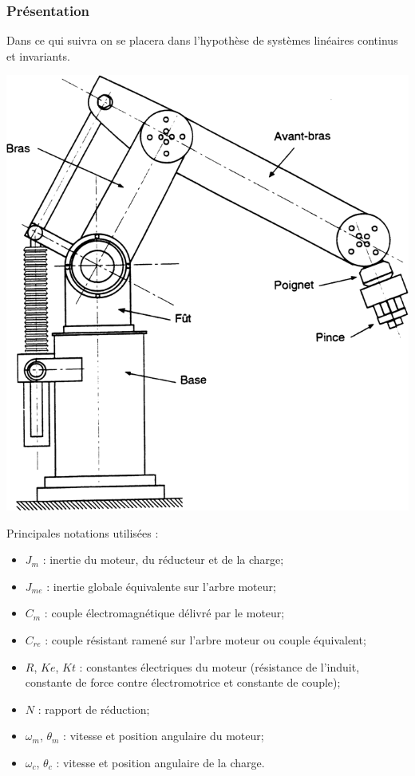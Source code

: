 \subsubsection{Présentation}

Dans ce qui suivra on se placera dans l’hypothèse de systèmes linéaires continus et invariants.


\begin{minipage}[c]{.3\linewidth}
\begin{center}
\includegraphics[width=\textwidth]{png/fig_01-1O}
\end{center}
\end{minipage} \hfill
\begin{minipage}[c]{.65\linewidth}
Principales notations utilisées : 
\begin{itemize}
\item $J_m$ : inertie du moteur, du réducteur et de la charge;
\item $J_{me}$ : inertie globale équivalente sur l’arbre moteur;
\item $C_m$ : couple électromagnétique délivré par le moteur;
\item $C_{re}$ : couple résistant ramené sur l’arbre moteur ou couple équivalent;
\item $R$, $Ke$, $Kt$ : constantes électriques du moteur (résistance de l’induit, constante 	de force contre électromotrice et constante de couple);
\item $N$ : rapport de réduction;
\item $\omega_m$, $\theta_m$ : vitesse et position angulaire du moteur;
\item $\omega_c$, $\theta_c$ : vitesse et position angulaire de la charge.
\end{itemize}
\end{minipage}

